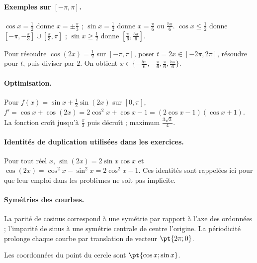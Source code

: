 \paragraph{Exemples sur $[-\pi,\pi]$.} $\cos x=\frac{1}{2}$ donne $x=\pm\frac{\pi}{3}$ ; $\sin x=\frac{1}{2}$ donne $x=\frac{\pi}{6}$ ou $\frac{5\pi}{6}$. $\cos x\le\frac{1}{2}$ donne $[-\pi,-\frac{\pi}{3}]\cup[\frac{\pi}{3},\pi]$ ; $\sin x\ge\frac{1}{2}$ donne $[\frac{\pi}{6},\frac{5\pi}{6}]$.
\begin{method}
Pour résoudre $\cos (2x)=\frac{1}{2}$ sur $[-\pi,\pi]$, poser $t=2x\in[-2\pi,2\pi]$, résoudre pour $t$, puis diviser par $2$. On obtient $x\in\{-\frac{5\pi}{6},-\frac{\pi}{6},\frac{\pi}{6},\frac{5\pi}{6}\}$.
\end{method}
\paragraph{Optimisation.} Pour $f(x)=\sin x+\frac12\sin(2x)$ sur $[0,\pi]$, $f'=\cos x+\cos(2x)=2\cos^2x+\cos x-1=(2\cos x-1)(\cos x+1)$. La fonction croît jusqu'à $\frac{\pi}{3}$ puis décroît ; maximum $\frac{3\sqrt{3}}{4}$.
\paragraph{Identités de duplication utilisées dans les exercices.} Pour tout réel $x$, $\sin(2x)=2\sin x\cos x$ et $\cos(2x)=\cos^2x-\sin^2x=2\cos^2x-1$. Ces identités sont rappelées ici pour que leur emploi dans les problèmes ne soit pas implicite.
\paragraph{Symétries des courbes.} La parité de cosinus correspond à une symétrie par rapport à l'axe des ordonnées ; l'imparité de sinus à une symétrie centrale de centre l'origine. La périodicité prolonge chaque courbe par translation de vecteur $\pt{2\pi;0}$.


\begin{center}\par\small Les coordonnées du point du cercle sont $\pt{\cos x;\sin x}$.\end{center}

